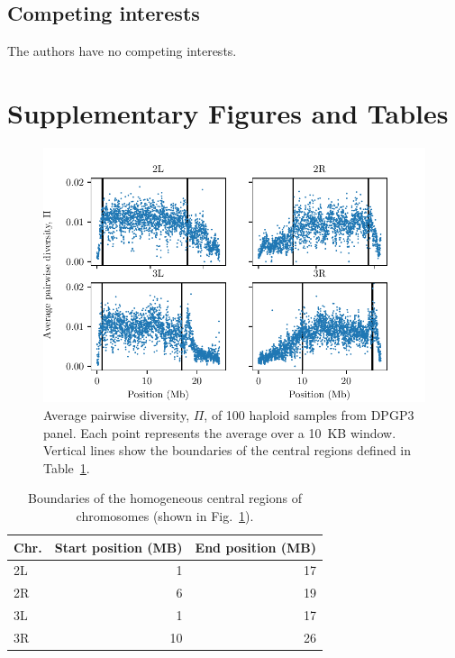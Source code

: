 \documentclass[11pt, letterpaper]{article}   	%
\newcommand{\beginsupplement}{%
        \setcounter{table}{0}
        \renewcommand{\thetable}{S\arabic{table}}%
        \setcounter{figure}{0}
        \renewcommand{\thefigure}{S\arabic{figure}}%
     }
\newcommand{\fig}[1]{Fig.~\ref{#1}}
\begin{document}
\subsection*{Competing interests}
The authors have no competing interests.

\printbibliography

\clearpage
\beginsupplement
\section*{Supplementary Figures and Tables}

\begin{figure}[ht!]
\centering
\includegraphics[scale=1]{figures/pi_vs_position.pdf}
\caption{Average pairwise diversity, $\Pi$, of 100 haploid samples from DPGP3 panel. Each point represents the average over a 10~KB window. Vertical lines show the boundaries of the central regions defined in Table~\ref{tab:central_regions}.
\label{fig:dpgp_pi}}
\end{figure}

\begin{table}[ht!]
  \begin{center}
    \caption{Boundaries of the homogeneous central regions of chromosomes (shown in \fig{fig:dpgp_pi}).}
    \label{tab:central_regions}
    \begin{tabular}{l|r|r} %
      \textbf{Chr.} & \textbf{Start position (MB)} & \textbf{End position (MB)}\\
      \hline
      2L & 1 & 17\\
      2R & 6 & 19\\
      3L & 1 & 17\\
      3R & 10 & 26
    \end{tabular}
  \end{center}
\end{table}
\end{document}

